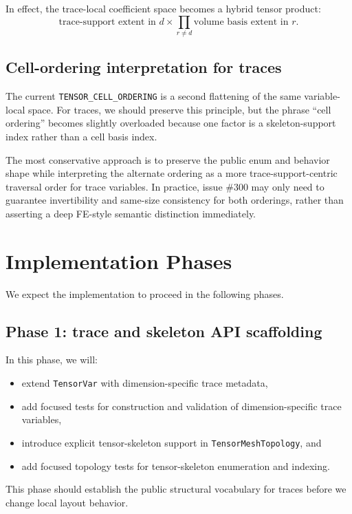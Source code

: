 \documentclass[11pt]{article}
\begin{document}
In effect, the trace-local coefficient space becomes a hybrid tensor product:
\[
\text{trace-support extent in } d \times \prod_{r \ne d} \text{volume basis extent in } r.
\]

\subsection{Cell-ordering interpretation for traces}

The current \texttt{TENSOR\_CELL\_ORDERING} is a second flattening of the same variable-local space. For traces, we should preserve this principle, but the phrase ``cell ordering'' becomes slightly overloaded because one factor is a skeleton-support index rather than a cell basis index.

The most conservative approach is to preserve the public enum and behavior shape while interpreting the alternate ordering as a more trace-support-centric traversal order for trace variables. In practice, issue \#300 may only need to guarantee invertibility and same-size consistency for both orderings, rather than asserting a deep FE-style semantic distinction immediately.

\section{Implementation Phases}

We expect the implementation to proceed in the following phases.

\subsection{Phase 1: trace and skeleton API scaffolding}

In this phase, we will:
\begin{itemize}[leftmargin=2em]
  \item extend \texttt{TensorVar} with dimension-specific trace metadata,
  \item add focused tests for construction and validation of dimension-specific trace variables,
  \item introduce explicit tensor-skeleton support in \texttt{TensorMeshTopology}, and
  \item add focused topology tests for tensor-skeleton enumeration and indexing.
\end{itemize}

This phase should establish the public structural vocabulary for traces before we change local layout behavior.
\end{document}
